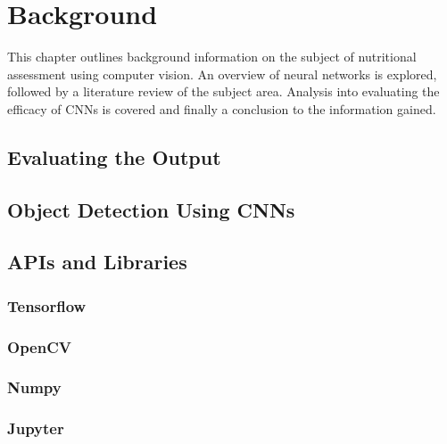 \chapter{Background}
\label{background}

This chapter outlines background information on the subject of nutritional assessment using computer vision.
An overview of neural networks is explored, followed by a literature review of the subject area.
Analysis into evaluating the efficacy of CNNs is covered and finally a conclusion to the information gained.











\section{Evaluating the Output}




\section{Object Detection Using CNNs}


\section{APIs and Libraries}
\subsection*{Tensorflow}


\subsection*{OpenCV}


\subsection*{Numpy}


\subsection*{Jupyter}


